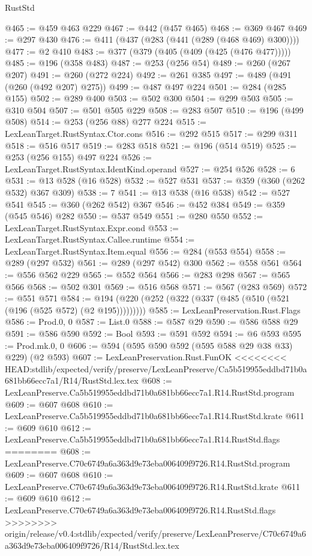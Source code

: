 \begin{lexlean}{RustStd}
\begin{coremodule}
{\begin{coremodule}
{{{{{{{{{{@465 := @459 @463 @229
@467 := @442 (@457 @465)
@468 := @369 @467
@469 := @297 @430
@476 := @411 (@437 (@283 (@441 (@289 (@468 @469) @300))))
@477 := @2 @410
@483 := @377 (@379 (@405 (@409 (@425 (@476 @477)))))
@485 := @196 (@358 @483)
@487 := @253 (@256 @54)
@489 := @260 (@267 @207)
@491 := @260 (@272 @224)
@492 := @261 @385
@497 := @489 (@491 (@260 (@492 @207) @275))
@499 := @487 @497 @224
@501 := @284 (@285 @155)
@502 := @289 @400
@503 := @502 @300
@504 := @299 @503
@505 := @310 @504
@507 := @501 @505 @229
@508 := @283 @507
@510 := @196 (@499 @508)
@514 := @253 (@256 @88) @277 @224
@515 := LexLeanTarget.RustSyntax.Ctor.cons
@516 := @292 @515
@517 := @299 @311
@518 := @516 @517
@519 := @283 @518
@521 := @196 (@514 @519)
@525 := @253 (@256 @155) @497 @224
@526 := LexLeanTarget.RustSyntax.IdentKind.operand
@527 := @254 @526
@528 := 6
@531 := @13 @528 (@16 @528)
@532 := @527 @531
@537 := @359 (@360 (@262 @532) @367 @309)
@538 := 7
@541 := @13 @538 (@16 @538)
@542 := @527 @541
@545 := @360 (@262 @542) @367
@546 := @452 @384
@549 := @359 (@545 @546) @282
@550 := @537 @549
@551 := @280 @550
@552 := LexLeanTarget.RustSyntax.Expr.cond
@553 := LexLeanTarget.RustSyntax.Callee.runtime
@554 := LexLeanTarget.RustSyntax.Item.equal
@556 := @284 (@553 @554)
@558 := @289 (@297 @532)
@561 := @289 (@297 @542) @300
@562 := @558 @561
@564 := @556 @562 @229
@565 := @552 @564
@566 := @283 @298
@567 := @565 @566
@568 := @502 @301
@569 := @516 @568
@571 := @567 (@283 @569)
@572 := @551 @571
@584 := @194 (@220 (@252 (@322 (@337 (@485 (@510 (@521 (@196 (@525 @572) (@2 @195)))))))))
@585 := LexLeanPreservation.Rust.Flags
@586 := Prod.{0, 0}
@587 := List.{0}
@588 := @587 @29
@590 := @586 @588 @29
@591 := @586 @590
@592 := Bool
@593 := @591 @592
@594 := @6 @593
@595 := Prod.mk.{0, 0}
@606 := @594 (@595 @590 @592 (@595 @588 @29 @38 @33) @229) (@2 @593)
@607 := LexLeanPreservation.Rust.FunOK
<<<<<<<< HEAD:stdlib/expected/verify/preserve/LexLeanPreserve/Ca5b519955eddbd71b0a681bb66ecc7a1/R14/RustStd.lex.tex
@608 := LexLeanPreserve.Ca5b519955eddbd71b0a681bb66ecc7a1.R14.RustStd.program
@609 := @607 @608
@610 := LexLeanPreserve.Ca5b519955eddbd71b0a681bb66ecc7a1.R14.RustStd.krate
@611 := @609 @610
@612 := LexLeanPreserve.Ca5b519955eddbd71b0a681bb66ecc7a1.R14.RustStd.flags
========
@608 := LexLeanPreserve.C70c6749a6a363d9e73eba006409f9726.R14.RustStd.program
@609 := @607 @608
@610 := LexLeanPreserve.C70c6749a6a363d9e73eba006409f9726.R14.RustStd.krate
@611 := @609 @610
@612 := LexLeanPreserve.C70c6749a6a363d9e73eba006409f9726.R14.RustStd.flags
>>>>>>>> origin/release/v0.4:stdlib/expected/verify/preserve/LexLeanPreserve/C70c6749a6a363d9e73eba006409f9726/R14/RustStd.lex.tex
}}}}}}}}}}
\end{coremodule}}
\end{coremodule}
\end{lexlean}
